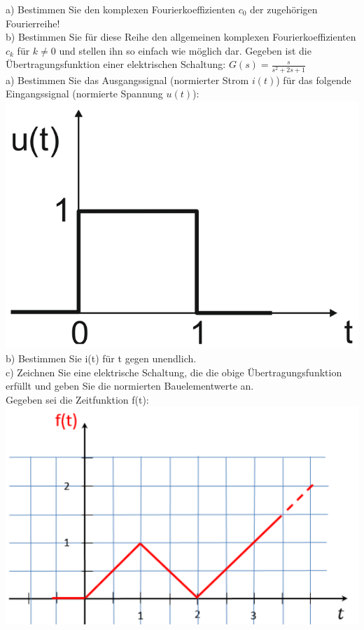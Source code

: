 \documentclass[A4]{scrartcl}
\begin{document}
  a) Bestimmen Sie den komplexen Fourierkoeffizienten $c_0$ der zugehörigen Fourierreihe!\\
  b) Bestimmen Sie für diese Reihe den allgemeinen komplexen Fourierkoeffizienten $c_k$ für $k\neq 0$ und stellen ihn so einfach wie möglich dar.
  \newpage
  Gegeben ist die Übertragungsfunktion einer elektrischen Schaltung: $G(s) = \frac{s}{s^2+2s+1}$\\
  a) Bestimmen Sie das Ausgangssignal (normierter Strom $i(t)$) für das folgende Eingangssignal (normierte Spannung $u(t)$):\\
  \includegraphics{zeitfunktion3.png}\\
  b) Bestimmen Sie i(t) für t gegen unendlich.\\
  c) Zeichnen Sie eine elektrische Schaltung, die die obige Übertragungsfunktion erfüllt und geben Sie die normierten Bauelementwerte an.\\
  \newpage
  Gegeben sei die Zeitfunktion f(t):\\
  \includegraphics{zeitfunktion4.png}\\
\end{document}
